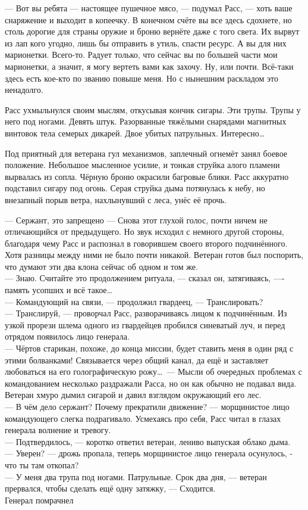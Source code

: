 \noindent --- Вот вы ребята --- настоящее пушечное мясо, --- подумал Расс, --- 
хоть ваше снаряжение и выходит в копеечку. В конечном счёте вы все здесь 
сдохнете, но столь дорогие для страны оружие и броню вернёте даже с того света. 
Их вырвут из лап кого угодно, лишь бы отправить в утиль, спасти ресурс. А вы для 
них марионетки. Всего-то. Радует только, что сейчас вы по большей части мои 
марионетки, а значит, я могу вертеть вами как захочу. Ну, или почти. Всё-таки 
здесь есть кое-кто по званию повыше меня. Но с нынешним раскладом это 
ненадолго. 

Расс ухмыльнулся своим мыслям, откусывая кончик сигары. Эти трупы. Трупы у него 
под ногами. Девять штук. Разорванные тяжёлыми снарядами магнитных винтовок тела 
семерых дикарей. Двое убитых патрульных. Интересно\ldots

Под приятный для ветерана гул механизмов, заплечный огнемёт занял боевое 
положение. Небольшое мысленное усилие, и тонкая струйка алого пламени вырвалась 
из сопла. Чёрную броню окрасили багровые блики. Расс аккуратно подставил сигару 
под огонь. Серая струйка дыма потянулась к небу, но внезапный порыв ветра, 
нахлынувший с леса, унёс её прочь.

\noindent --- Сержант, это запрещено --- Снова этот глухой голос, почти ничем 
не отличающийся от предыдущего. Но звук исходил с немного другой стороны, 
благодаря чему Расс и распознал в говорившем своего второго подчинённого. Хотя 
разницы между ними не было почти никакой. Ветеран готов был поспорить, что 
думают эти два клона сейчас об одном и том же.\\
--- Знаю. Считайте это продолжением ритуала, --- сказал он, затягиваясь, ---- 
память усопших и всё такое\ldots\\
--- Командующий на связи, --- продолжил гвардеец, --- Транслировать?\\
--- Транслируй, --- проворчал Расс, разворачиваясь лицом к подчинённым. Из 
узкой прорези шлема одного из гвардейцев пробился синеватый луч, и перед 
отрядом появилось лицо генерала. \\
--- Чёртов старикан, похоже, до конца миссии, будет ставить меня в один ряд с 
этими болванками! Связывается через общий канал, да ещё и заставляет любоваться 
на его голографическую рожу\ldots\ --- Мысли об очередных проблемах с 
командованием несколько раздражали Расса, но он как обычно не подавал вида. 
Ветеран хмуро дымил сигарой и давил взглядом окружающий его лес.\\
--- В чём дело сержант? Почему прекратили движение? --- морщинистое лицо 
командующего слегка подрагивало. Усмехаясь про себя, Расс читал в глазах 
генерала волнение и тревогу.\\
--- Подтвердилось, --- коротко ответил ветеран, лениво выпуская облако дыма.\\
--- Уверен? --- дрожь пропала, теперь морщинистое лицо генерала осунулось, - 
что ты там откопал?\\
--- У меня два трупа под ногами. Патрульные. Срок два дня, --- ветеран 
прервался, чтобы сделать ещё одну затяжку, --- Сходится.\\
Генерал помрачнел\\

